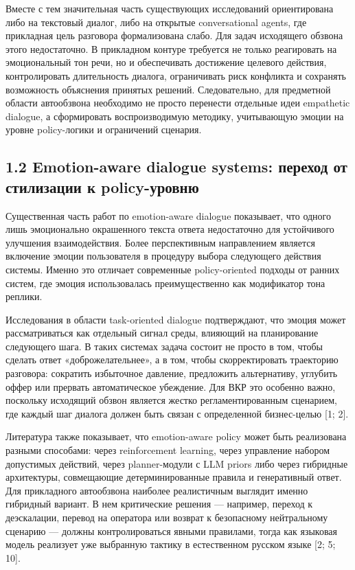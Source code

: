 \documentclass[a4paper,14pt]{extarticle}
\begin{document}
Вместе с тем значительная часть существующих исследований ориентирована
либо на текстовый диалог, либо на открытые conversational agents, где
прикладная цель разговора формализована слабо. Для задач исходящего
обзвона этого недостаточно. В прикладном контуре требуется не только
реагировать на эмоциональный тон речи, но и обеспечивать достижение
целевого действия, контролировать длительность диалога, ограничивать
риск конфликта и сохранять возможность объяснения принятых решений.
Следовательно, для предметной области автообзвона необходимо не просто
перенести отдельные идеи empathetic dialogue, а сформировать
воспроизводимую методику, учитывающую эмоции на уровне policy-логики и
ограничений сценария.

\subsection{1.2 Emotion-aware dialogue systems: переход от стилизации к
policy-уровню}\label{emotion-aware-dialogue-systems-ux43fux435ux440ux435ux445ux43eux434-ux43eux442-ux441ux442ux438ux43bux438ux437ux430ux446ux438ux438-ux43a-policy-ux443ux440ux43eux432ux43dux44e}

Существенная часть работ по emotion-aware dialogue показывает, что
одного лишь эмоционально окрашенного текста ответа недостаточно для
устойчивого улучшения взаимодействия. Более перспективным направлением
является включение эмоции пользователя в процедуру выбора следующего
действия системы. Именно это отличает современные policy-oriented
подходы от ранних систем, где эмоция использовалась преимущественно как
модификатор тона реплики.

Исследования в области task-oriented dialogue подтверждают, что эмоция
может рассматриваться как отдельный сигнал среды, влияющий на
планирование следующего шага. В таких системах задача состоит не просто
в том, чтобы сделать ответ «доброжелательнее», а в том, чтобы
скорректировать траекторию разговора: сократить избыточное давление,
предложить альтернативу, углубить оффер или прервать автоматическое
убеждение. Для ВКР это особенно важно, поскольку исходящий обзвон
является жестко регламентированным сценарием, где каждый шаг диалога
должен быть связан с определенной бизнес-целью {[}1; 2{]}.

Литература также показывает, что emotion-aware policy может быть
реализована разными способами: через reinforcement learning, через
управление набором допустимых действий, через planner-модули с LLM
priors либо через гибридные архитектуры, совмещающие детерминированные
правила и генеративный ответ. Для прикладного автообзвона наиболее
реалистичным выглядит именно гибридный вариант. В нем критические
решения --- например, переход к деэскалации, перевод на оператора или
возврат к безопасному нейтральному сценарию --- должны контролироваться
явными правилами, тогда как языковая модель реализует уже выбранную
тактику в естественном русском языке {[}2; 5; 10{]}.
\end{document}
